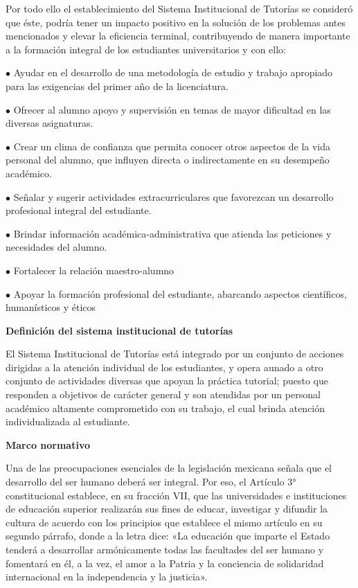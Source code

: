 Por todo ello el establecimiento del Sistema Institucional de Tutorías se consideró que éste, podría tener un impacto positivo en la solución de los problemas antes mencionados y elevar la eficiencia terminal, contribuyendo de manera importante a la formación integral de los estudiantes universitarios y con ello:

\begin{Obs}
\item[$\bullet$] Ayudar en el desarrollo de una metodología de estudio y trabajo apropiado para las exigencias del primer año de la licenciatura.
\item[$\bullet$] Ofrecer al alumno apoyo y supervisión en temas de mayor dificultad en las diversas asignaturas.
\item[$\bullet$] Crear un clima de confianza que permita conocer otros aspectos de la vida personal del alumno, que influyen directa o indirectamente en su desempeño académico.
\item[$\bullet$] Señalar y sugerir actividades extracurriculares que fa\-vo\-rez\-can un desa\-rro\-llo pro\-fe\-sional integral del estudiante.
\item[$\bullet$] Brindar información académica-administrativa que atienda las peticiones y necesidades del alumno.
\item[$\bullet$] Fortalecer la relación maestro-alumno
\item[$\bullet$] Apoyar la formación profesional del estudiante, abarcando aspectos científicos, humanísticos y éticos
\end{Obs}
\newpage

\textbf{Definición del sistema institucional de tutorías}

El Sistema Institucional de Tutorías está integrado por un conjunto de  acciones dirigidas a  la atención individual de  los estudiantes, y opera aunado a otro conjunto de  actividades diversas que apoyan la  práctica tutorial; puesto  que  responden  a  objetivos  de carácter general y son atendidas por un personal académico altamente comprometido con su trabajo, el cual brinda atención individualizada al estudiante.

\bigskip
\textbf{Marco normativo}

Una de las preocupaciones esenciales de la legislación mexicana señala que el desarrollo del ser humano deberá ser integral. Por eso, el Artículo 3° constitucional establece, en su fracción VII, que las universidades e instituciones de educación superior realizarán sus fines de educar, investigar y difundir la cultura de acuerdo con los principios que establece el mismo artículo en su segundo párrafo, donde  a la letra dice:  «La  educación  que  imparte  el  Estado tenderá a  desarrollar  armónicamente todas  las facultades  del  ser  humano  y fomentará en  él, a  la vez, el amor a  la Patria y la conciencia de solidaridad internacional  en la independencia y la justicia».

